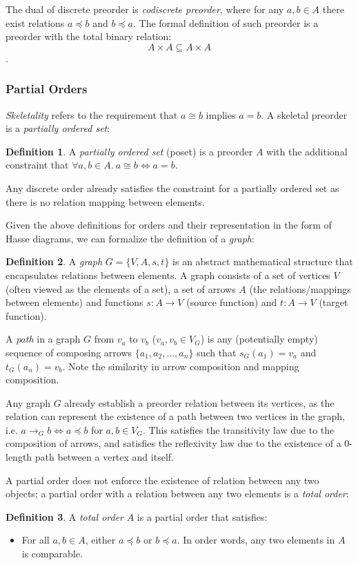 \documentclass[12pt]{article}
\theoremstyle{definition}
\newtheorem{defn}{Definition}[section]
\begin{document}
	The dual of discrete preorder is \emph{codiscrete preorder}, where for any $a, b \in A$ there exist relations $a \preceq b$ and $b \preceq a$. The formal definition of such preorder is a preorder with the total binary relation: $$A \times A \subseteq A \times A$$.
	
	\subsubsection{Partial Orders}
	
	\emph{Skeletality} refers to the requirement that $a \cong b$ implies $a = b$. A skeletal preorder is a \emph{partially ordered set}:
	\begin{defn}
		A \emph{partially ordered set} (poset) is a preorder $A$ with the additional constraint that $\forall a, b \in A.\ a \cong b \iff a = b$.
	\end{defn}
	
	Any discrete order already satisfies the constraint for a partially ordered set as there is no relation mapping between elements.
	
	Given the above definitions for orders and their representation in the form of Hasse diagrams, we can formalize the definition of a \emph{graph}:
	\begin{defn}
		A \emph{graph} $G = \{V, A, s, t\}$ is an abstract mathematical structure that encapsulates relations between elements. A graph consists of a set of vertices $V$ (often viewed as the elements of a set), a set of arrows $A$ (the relations/mappings between elements) and functions $s: A \to V$ (source function) and $t: A \to V$ (target function).
	\end{defn}
	
	A \emph{path} in a graph $G$ from $v_a$ to $v_b$ ($v_a, v_b \in V_G$) is any (potentially empty) sequence of composing arrows $\{a_1, a_2, \dots, a_n\}$ such that $s_G(a_1) = v_a$ and $t_G(a_n) = v_b$. Note the similarity in arrow composition and mapping composition.
	
	Any graph $G$ already establish a preorder relation between its vertices, as the relation can represent the existence of a path between two vertices in the graph, i.e. $a \to_G b \iff a \preceq b$ for $a, b \in V_G$. This satisfies the transitivity law due to the composition of arrows, and satisfies the reflexivity law due to the existence of a $0$-length path between a vertex and itself.
	
	A partial order does not enforce the existence of relation between any two objects; a partial order with a relation between any two elements is a \emph{total order}:
	\begin{defn}
		A \emph{total order} $A$ is a partial order that satisfies:
		\begin{itemize}
			\item For all $a, b \in A$, either $a \preceq b$ or $b \preceq a$. In order words, any two elements in $A$ is comparable.
		\end{itemize}
	\end{defn}
	
\end{document}
